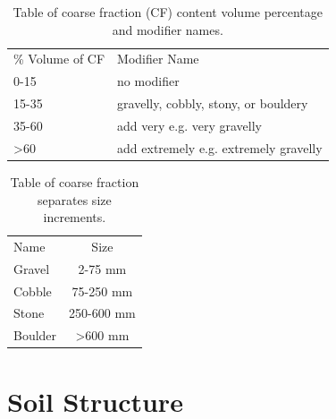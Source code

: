 \documentclass{book}
\begin{document}
\begin{table}[!htbp]
\centering
\caption{Table of coarse fraction (CF) content volume percentage and modifier names.}
\label{tab:coarsefractionvolume}
\begin{tabular}{|ll|}
\hline
\% Volume of CF  &  Modifier Name                        \\  \hhline{|==|}
0-15             & no modifier                           \\
15-35            & gravelly, cobbly, stony, or bouldery  \\
35-60            & add very e.g. very gravelly           \\
\textgreater{}60 & add extremely e.g. extremely gravelly \\
\hline
\end{tabular}
\end{table}

    
\begin{table}[!htbp]
\centering
\caption{Table of coarse fraction separates size increments.}
\label{tab:coarsefractionsizenames}
\begin{tabular}{|l c|}
\hline
Name        &  Size                \\ \hhline{|==|}
Gravel      & 2-75 mm              \\
Cobble      & 75-250 mm            \\
Stone       & 250-600 mm           \\
Boulder     & \textgreater{}600 mm \\
\hline
\end{tabular}
\end{table}

    
\section{Soil Structure}
\label{structure}
    
\end{document}

